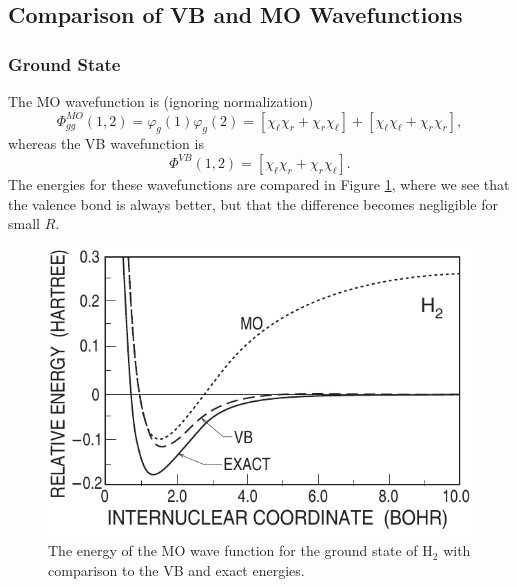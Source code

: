 \subsection{Comparison of VB and MO Wavefunctions}

\subsubsection{Ground State}

The MO wavefunction is (ignoring normalization)
\begin{equation}
\Phi^{MO}_{gg} ( 1 , 2 ) = \varphi_g ( 1 ) \varphi_g ( 2 ) = \left[ 
\chi_\ell \chi_r + \chi_r \chi_\ell \right] + \left[ \chi_\ell \chi_\ell + \chi_r 
\chi_r \right] ,
\end{equation}
whereas the VB wavefunction is
\begin{equation}
\Phi^{VB} ( 1 , 2 ) = \left[ \chi_\ell \chi_r + \chi_r \chi_\ell \right] .
\end{equation}
The energies for these wavefunctions are compared in Figure
\ref{fig2-27}, where we see that the valence bond is always better,
but that the difference becomes negligible for small $R$.

\begin{figure}
\includegraphics[scale=0.75]{fig2-27}
\caption{The energy of the MO wave function for the ground state of
  H$_2$ with comparison to the VB and exact energies.}
\label{fig2-27}
\end{figure}

